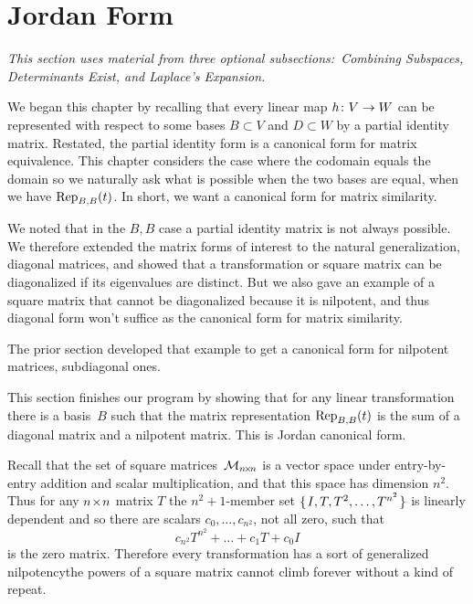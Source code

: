 \section{Jordan Form}
\noindent\textit{This section uses material from three optional
subsections:~Combining Subspaces, Determinants Exist, and
Laplace's Expansion.}

We began this chapter
by recalling that every linear map $\map{h}{V}{W}$ can
be represented with respect to some
bases $B\subset V$ and $D\subset W$ by a partial identity matrix.
Restated, the partial identity form is a canonical form for 
matrix equivalence. 
This chapter considers the case where
the codomain equals the domain so 
we naturally ask what is possible when the
two bases are equal, when we have $\rep{t}{B,B}$.
In short, we want a canonical form for matrix similarity.

We noted that in the $B,B$ case
a partial identity matrix is not always possible.
We therefore extended the matrix 
forms of interest to the natural generalization, 
diagonal matrices, and
showed that a transformation or square matrix can be diagonalized
if its eigenvalues are distinct.
But we also gave an example of a 
square matrix that cannot be diagonalized
because it is nilpotent,
and thus diagonal form won't suffice as the canonical form 
for matrix similarity. 

The prior section developed that example
to get a canonical form for nilpotent matrices, subdiagonal ones.

This section finishes our program by
showing that for any linear transformation there is
a basis~\( B \) 
such that the matrix representation $\rep{t}{B,B}$ is the sum of a 
diagonal matrix and a nilpotent matrix.
This is Jordan canonical form.









Recall that the set of square matrices~\( \matspace_{\nbyn{n}} \)
is a vector space under entry-by-entry addition and scalar multiplication,
and that 
this space has dimension \( n^2 \).
Thus for any \( \nbyn{n} \) matrix $T$ the
\( n^2+1 \)-member set \( \set{I,T,T^2,\dots,T^{n^2} } \) is linearly
dependent and so there are scalars \( c_0,\dots,c_{n^2} \),
not all zero, such that
\begin{equation*}
  c_{n^2}T^{n^2}+\dots+c_1T+c_0I
\end{equation*}
is the zero matrix.
Therefore every transformation has a sort of generalized 
nilpotency\Dash the powers
of a square matrix cannot climb forever without a kind of repeat.

